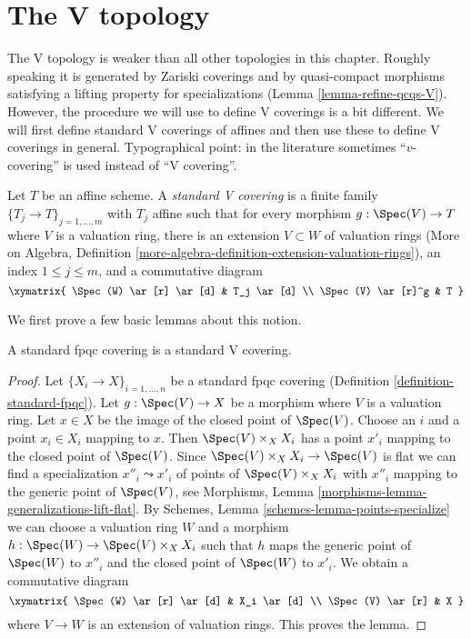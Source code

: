 \section{The V topology}
\label{section-V}

\noindent
The V topology is weaker than all other topologies in this chapter.
Roughly speaking it is generated by Zariski coverings and
by quasi-compact morphisms satisfying a lifting property
for specializations (Lemma \ref{lemma-refine-qcqs-V}).
However, the procedure we will use to define V coverings is a bit different.
We will first define standard V coverings of affines and then
use these to define V coverings in general. Typographical point:
in the literature sometimes ``$v$-covering'' is used instead of ``V covering''.

\begin{definition}
\label{definition-standard-V-covering}
Let $T$ be an affine scheme. A {\it standard V covering} is a finite family
$\{T_j \to T\}_{j = 1, \ldots, m}$ with $T_j$ affine
such that for every morphism $g : \Spec(V) \to T$ where $V$
is a valuation ring, there is an extension $V \subset W$ of valuation rings
(More on Algebra, Definition
\ref{more-algebra-definition-extension-valuation-rings}),
an index $1 \leq j \leq m$, and a commutative diagram
$$
\xymatrix{
\Spec(W) \ar[r] \ar[d] & T_j \ar[d] \\
\Spec(V) \ar[r]^g & T
}
$$
\end{definition}

\noindent
We first prove a few basic lemmas about this notion.

\begin{lemma}
\label{lemma-standard-fpqc-standard-V}
A standard fpqc covering is a standard V covering.
\end{lemma}

\begin{proof}
Let $\{X_i \to X\}_{i = 1, \ldots, n}$ be a standard fpqc covering
(Definition \ref{definition-standard-fpqc}). Let $g : \Spec(V) \to X$
be a morphism where $V$ is a valuation ring. Let $x \in X$ be the
image of the closed point of $\Spec(V)$. Choose an $i$ and a point
$x_i \in X_i$ mapping to $x$. Then $\Spec(V) \times_X X_i$
has a point $x'_i$ mapping to the closed point of $\Spec(V)$.
Since $\Spec(V) \times_X X_i \to \Spec(V)$ is flat
we can find a specialization $x''_i \leadsto x'_i$ of
points of $\Spec(V) \times_X X_i$ with $x''_i$ mapping to
the generic point of $\Spec(V)$, see
Morphisms, Lemma \ref{morphisms-lemma-generalizations-lift-flat}. By
Schemes, Lemma \ref{schemes-lemma-points-specialize}
we can choose a valuation ring $W$ and a morphism
$h : \Spec(W) \to \Spec(V) \times_X X_i$ such that $h$
maps the generic point of $\Spec(W)$ to $x''_i$ and the
closed point of $\Spec(W)$ to $x'_i$. We obtain a
commutative diagram
$$
\xymatrix{
\Spec(W) \ar[r] \ar[d] & X_i \ar[d] \\
\Spec(V) \ar[r] & X
}
$$
where $V \to W$ is an extension of valuation rings.
This proves the lemma.
\end{proof}

